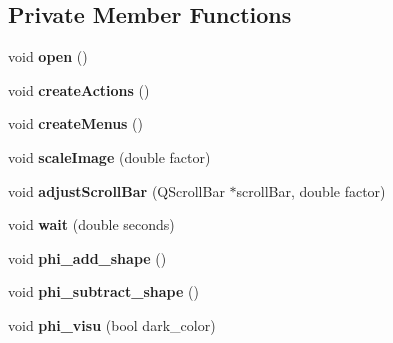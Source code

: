 \subsection*{Private Member Functions}
\begin{DoxyCompactItemize}
\item 
\hypertarget{classofeli_1_1_image_viewer_adc037960bb21634459d1394ae25dfcfa}{void {\bfseries open} ()}\label{classofeli_1_1_image_viewer_adc037960bb21634459d1394ae25dfcfa}

\item 
\hypertarget{classofeli_1_1_image_viewer_ad6b4962d6bb9c60853d3c24c68765d94}{void {\bfseries create\-Actions} ()}\label{classofeli_1_1_image_viewer_ad6b4962d6bb9c60853d3c24c68765d94}

\item 
\hypertarget{classofeli_1_1_image_viewer_a71a5236f714ce4a7c403f55b386c14d6}{void {\bfseries create\-Menus} ()}\label{classofeli_1_1_image_viewer_a71a5236f714ce4a7c403f55b386c14d6}

\item 
\hypertarget{classofeli_1_1_image_viewer_a33abd30b066c192a70b0767f2c94a985}{void {\bfseries scale\-Image} (double factor)}\label{classofeli_1_1_image_viewer_a33abd30b066c192a70b0767f2c94a985}

\item 
\hypertarget{classofeli_1_1_image_viewer_a0749ffba0491f44389abeb4c086d80d4}{void {\bfseries adjust\-Scroll\-Bar} (Q\-Scroll\-Bar $\ast$scroll\-Bar, double factor)}\label{classofeli_1_1_image_viewer_a0749ffba0491f44389abeb4c086d80d4}

\item 
\hypertarget{classofeli_1_1_image_viewer_acf94844c75b8f3a3de806d64660243dc}{void {\bfseries wait} (double seconds)}\label{classofeli_1_1_image_viewer_acf94844c75b8f3a3de806d64660243dc}

\item 
\hypertarget{classofeli_1_1_image_viewer_a76e92eb5d2553e81759e1e0d3a9c0b93}{void {\bfseries phi\-\_\-add\-\_\-shape} ()}\label{classofeli_1_1_image_viewer_a76e92eb5d2553e81759e1e0d3a9c0b93}

\item 
\hypertarget{classofeli_1_1_image_viewer_a9cd2157fd04e6733b307af16ef937895}{void {\bfseries phi\-\_\-subtract\-\_\-shape} ()}\label{classofeli_1_1_image_viewer_a9cd2157fd04e6733b307af16ef937895}

\item 
\hypertarget{classofeli_1_1_image_viewer_aa0f1cdb05e205e28742698fba5266f79}{void {\bfseries phi\-\_\-visu} (bool dark\-\_\-color)}\label{classofeli_1_1_image_viewer_aa0f1cdb05e205e28742698fba5266f79}


\end{DoxyCompactItemize}
